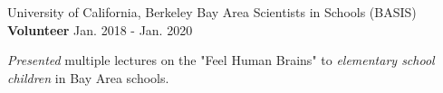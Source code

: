 \begin{cventries}
  \cventry
  	{University of California, Berkeley} %
  	{Bay Area Scientists in Schools (BASIS)}
    {\textbf{Volunteer}} %
    {Jan. 2018 - Jan. 2020} %
    {
      \begin{cvitems} %
        \item {\textit{Presented} multiple lectures on the "Feel Human Brains" to \textit{elementary school children} in Bay Area schools.}
      \end{cvitems}
    }

\end{cventries}
